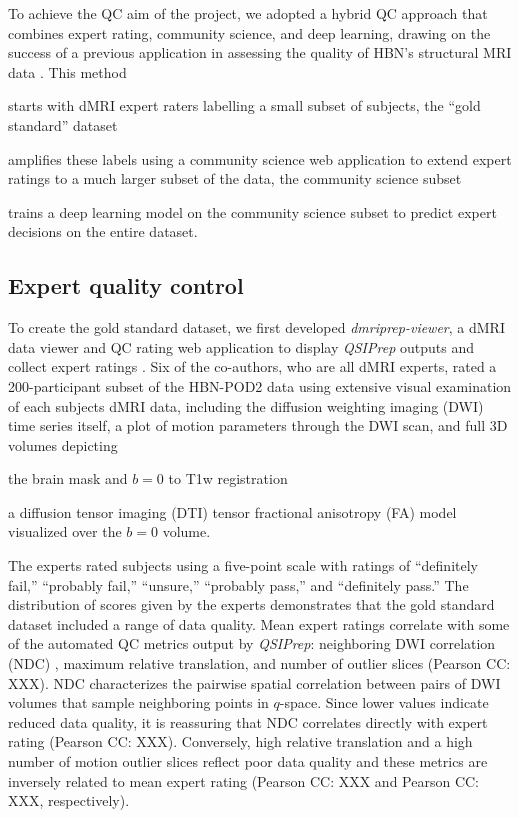 \documentclass[fleqn,10pt]{wlscirep}
\begin{document}
To achieve the QC aim of the project, we adopted a hybrid QC approach that
combines expert rating, community science, and deep learning, drawing on the success of a previous application in
assessing the quality of HBN's structural MRI data \cite{keshavan2019-er}.
This method
\begin{enumerate*}[%
    label=(\roman*),%
    before={{ }},%
    itemjoin={{, }},%
    itemjoin*={{ and }}]
    \item starts with dMRI expert raters labelling a small subset of subjects,
    the ``gold standard'' dataset
    \item amplifies these labels using a community science web application to
    extend expert ratings to a much larger subset of the data, the community
    science subset
    \item trains a deep learning model on the community science subset to
    predict expert decisions on the entire dataset.
\end{enumerate*}

\subsection*{Expert quality control}

To create the gold standard dataset, we first developed \emph{dmriprep-viewer},
a dMRI data viewer and QC rating web application to display \emph{QSIPrep}
outputs and collect expert ratings \cite{richie-halford2021-viewer}. Six of the
co-authors, who are all dMRI experts, rated a 200-participant subset of the
HBN-POD2 data using extensive visual examination of each subjects dMRI data,
including the diffusion weighting imaging (DWI) time series itself, a plot of
motion parameters through the DWI scan, and full 3D volumes depicting
\begin{enumerate*}[%
    label=(\roman*),%
    before={{ }},%
    itemjoin={{, }},%
    itemjoin*={{ and }}]
    \item the brain mask and $b=0$ to T1w registration
    \item a diffusion tensor imaging (DTI) tensor fractional anisotropy (FA)
    model visualized over the $b=0$ volume.
\end{enumerate*}
The experts rated subjects using a five-point scale with ratings of ``definitely
fail,'' ``probably fail,'' ``unsure,'' ``probably pass,'' and ``definitely
pass.'' The distribution of scores given by the experts demonstrates that the
gold standard dataset included a range of data quality. Mean expert ratings
correlate with some of the automated QC metrics output by \emph{QSIPrep}:
neighboring DWI correlation (NDC) \cite{yeh2019-kb}, maximum relative
translation, and number of outlier slices (Pearson CC: XXX). NDC characterizes
the pairwise spatial correlation between pairs of DWI volumes that sample
neighboring points in $q$-space. Since lower values indicate reduced data
quality, it is reassuring that NDC correlates directly with expert rating
(Pearson CC: XXX). Conversely, high relative translation and a high number of
motion outlier slices reflect poor data quality and these metrics are inversely
related to mean expert rating (Pearson CC: XXX and Pearson CC: XXX,
respectively).
\end{document}
